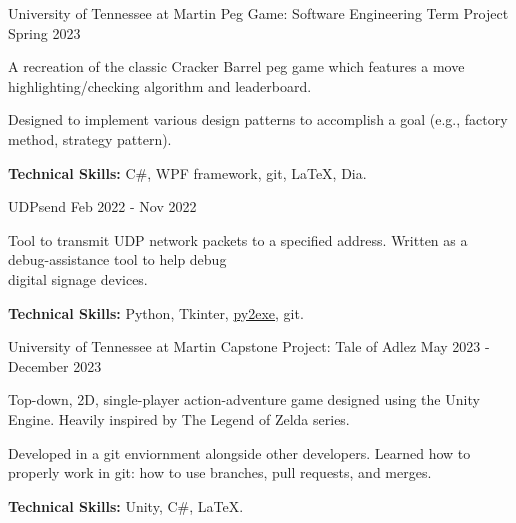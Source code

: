 
\begin{cventries}

	\cventry
		{University of Tennessee at Martin}
		{Peg Game: Software Engineering Term Project}
		{}
		{Spring 2023}
		{
		\begin{cvitems}
			\item A recreation of the classic Cracker Barrel peg game which features a move highlighting/checking algorithm and leaderboard.
			\item Designed to implement various design patterns to accomplish a goal (e.g., factory method, strategy pattern).
			\item \textbf{Technical Skills:} C\#, WPF framework, git, \LaTeX, Dia.
		\end{cvitems}
		}
		
	\cventry
		{}
		{UDPsend}
		{}
		{Feb 2022 - Nov 2022}
		{
		\vspace{-1.5em}
		\begin{cvitems}
			\item Tool to transmit UDP network packets to a specified address. Written as a debug-assistance tool to help debug \\digital signage devices.
			\item \textbf{Technical Skills:} Python, Tkinter, \href{https://www.py2exe.org/}{py2exe}, git.
		\end{cvitems}
		}	
		
	\cventry
		{University of Tennessee at Martin}
		{Capstone Project: Tale of Adlez}
		{}
		{May 2023 - December 2023}
		{
		\begin{cvitems}
			\item Top-down, 2D, single-player action-adventure game designed using the Unity Engine. Heavily inspired by The Legend of Zelda series.
			\item Developed in a git enviornment alongside other developers. Learned how to properly work in git: how to use branches, pull requests, and merges.
			\item \textbf{Technical Skills:} Unity, C\#, \LaTeX.
		\end{cvitems}
		}		

		



\end{cventries}
